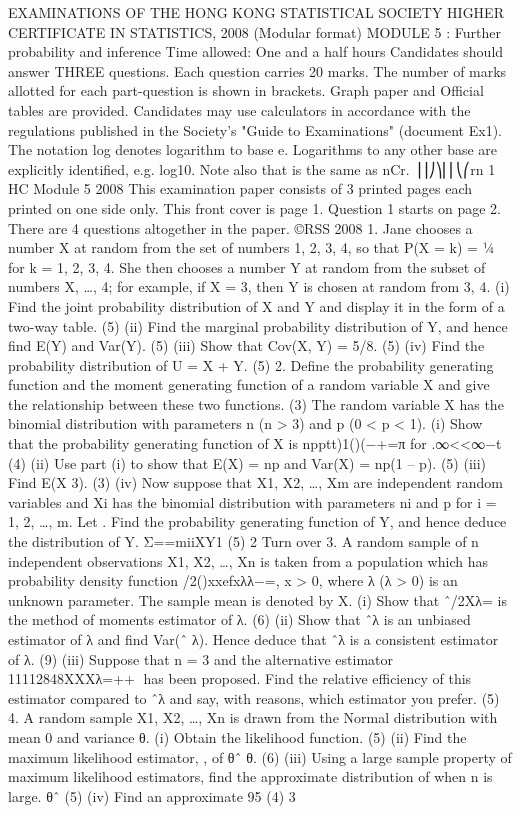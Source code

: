 EXAMINATIONS OF THE HONG KONG STATISTICAL SOCIETY
HIGHER CERTIFICATE IN STATISTICS, 2008
(Modular format)
MODULE 5 : Further probability and inference
Time allowed: One and a half hours
Candidates should answer THREE questions.
Each question carries 20 marks.
The number of marks allotted for each part-question is shown in brackets.
Graph paper and Official tables are provided.
Candidates may use calculators in accordance with the regulations published in
the Society's "Guide to Examinations" (document Ex1).
The notation log denotes logarithm to base e.
Logarithms to any other base are explicitly identified, e.g. log10.
Note also that is the same as nCr. ⎟⎟⎠⎞⎜⎜⎝⎛rn
1 HC Module 5 2008
This examination paper consists of 3 printed pages each printed on one side only.
This front cover is page 1.
Question 1 starts on page 2.
There are 4 questions altogether in the paper.
©RSS 2008
1. Jane chooses a number X at random from the set of numbers {1, 2, 3, 4}, so that
P(X = k) = ¼ for k = 1, 2, 3, 4.
She then chooses a number Y at random from the subset of numbers {X, …, 4}; for example, if X = 3, then Y is chosen at random from {3, 4}.
(i) Find the joint probability distribution of X and Y and display it in the form of a two-way table.
(5)
(ii) Find the marginal probability distribution of Y, and hence find E(Y) and Var(Y).
(5)
(iii) Show that Cov(X, Y) = 5/8.
(5)
(iv) Find the probability distribution of U = X + Y.
(5)
2. Define the probability generating function and the moment generating function of a random variable X and give the relationship between these two functions.
(3)
The random variable X has the binomial distribution with parameters n (n > 3) and p (0 < p < 1).
(i) Show that the probability generating function of X is
npptt)1()(−+=π
for .∞<<∞−t
(4)
(ii) Use part (i) to show that E(X) = np and Var(X) = np(1 – p).
(5)
(iii) Find E(X 3).
(3)
(iv) Now suppose that X1, X2, …, Xm are independent random variables and Xi has the binomial distribution with parameters ni and p for i = 1, 2, …, m. Let . Find the probability generating function of Y, and hence deduce the distribution of Y. Σ==miiXY1
(5)
2
Turn over
3. A random sample of n independent observations X1, X2, …, Xn is taken from a population which has probability density function /2()xxefxλλ−=, x > 0,
where λ (λ > 0) is an unknown parameter. The sample mean is denoted by X.
(i) Show that ˆ/2Xλ= is the method of moments estimator of λ.
(6)
(ii) Show that ˆλ is an unbiased estimator of λ and find Var(ˆ
λ). Hence deduce that ˆλ is a consistent estimator of λ.
(9)
(iii) Suppose that n = 3 and the alternative estimator 11112848XXXλ=++􀀄
has been proposed. Find the relative efficiency of this estimator compared to ˆλ
and say, with reasons, which estimator you prefer.
(5)
4. A random sample X1, X2, …, Xn is drawn from the Normal distribution with mean 0 and variance θ.
(i) Obtain the likelihood function.
(5)
(ii) Find the maximum likelihood estimator, , of θˆ θ.
(6)
(iii) Using a large sample property of maximum likelihood estimators, find the approximate distribution of when n is large. θˆ
(5)
(iv) Find an approximate 95%
(4)
3
